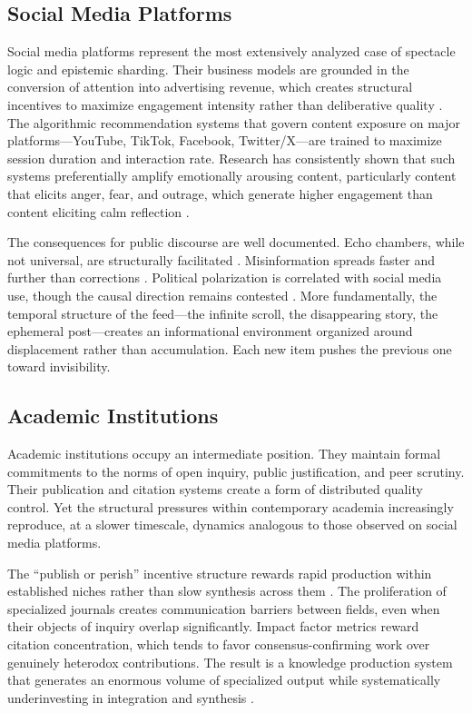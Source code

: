 \documentclass[12pt]{article}
\begin{document}
\subsection{Social Media Platforms}

Social media platforms represent the most extensively analyzed case of spectacle logic and epistemic sharding. Their business models are grounded in the conversion of attention into advertising revenue, which creates structural incentives to maximize engagement intensity rather than deliberative quality \citep{Zuboff2019}. The algorithmic recommendation systems that govern content exposure on major platforms---YouTube, TikTok, Facebook, Twitter/X---are trained to maximize session duration and interaction rate. Research has consistently shown that such systems preferentially amplify emotionally arousing content, particularly content that elicits anger, fear, and outrage, which generate higher engagement than content eliciting calm reflection \citep{Brady2017}.

The consequences for public discourse are well documented. Echo chambers, while not universal, are structurally facilitated \citep{Sunstein2017}. Misinformation spreads faster and further than corrections \citep{Vosoughi2018}. Political polarization is correlated with social media use, though the causal direction remains contested \citep{Settle2018}. More fundamentally, the temporal structure of the feed---the infinite scroll, the disappearing story, the ephemeral post---creates an informational environment organized around displacement rather than accumulation. Each new item pushes the previous one toward invisibility.

\subsection{Academic Institutions}

Academic institutions occupy an intermediate position. They maintain formal commitments to the norms of open inquiry, public justification, and peer scrutiny. Their publication and citation systems create a form of distributed quality control. Yet the structural pressures within contemporary academia increasingly reproduce, at a slower timescale, dynamics analogous to those observed on social media platforms.

The ``publish or perish'' incentive structure rewards rapid production within established niches rather than slow synthesis across them \citep{Smaldino2016}. The proliferation of specialized journals creates communication barriers between fields, even when their objects of inquiry overlap significantly. Impact factor metrics reward citation concentration, which tends to favor consensus-confirming work over genuinely heterodox contributions. The result is a knowledge production system that generates an enormous volume of specialized output while systematically underinvesting in integration and synthesis \citep{Gibbons1994}.
\end{document}
